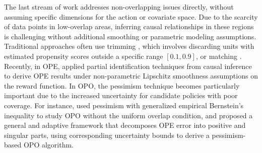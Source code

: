 The last stream of work addresses non-overlapping issues directly, without assuming specific dimensions for the action or covariate space. Due to the scarcity of data points in low-overlap areas, inferring causal relationships in these regions is challenging without additional smoothing or parametric modeling assumptions. Traditional approaches often use trimming \citep{rosenbaum1983central, crump2009dealing, petersen2012diagnosing}, which involves discarding units with estimated propensity scores outside a specific range $[0.1, 0.9]$, or matching \citep{visconti2018handling}. Recently, in \acrshort{OPE}, \citet{khan2023off} applied partial identification techniques from causal inference to derive \acrshort{OPE} results under non-parametric Lipschitz smoothness assumptions on the reward function. In \acrshort{OPO}, the pessimism technique becomes particularly important due to the increased uncertainty for candidate policies with poor coverage. For instance, \citet{jin2022policy} used pessimism with generalized empirical Bernstein’s inequality to study \acrshort{OPO} without the uniform overlap condition, and \citet{chen2023steel} proposed a general and adaptive framework that decomposes \acrshort{OPE} error into positive and singular parts, using corresponding uncertainty bounds to derive a pessimism-based \acrshort{OPO} algorithm.




